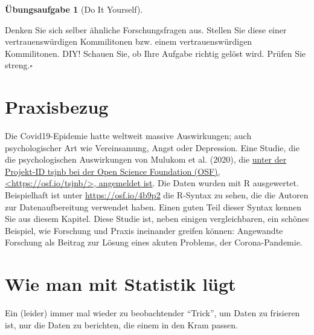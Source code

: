\documentclass[
  a4paper,
]{scrbook}
\theoremstyle{definition}
\theoremstyle{definition}
\theoremstyle{definition}
\newtheorem{exercise}{Übungsaufgabe}[chapter]
\theoremstyle{remark}
\begin{document}
\begin{exercise}[Do It
Yourself]\protect\hypertarget{exr-diy}{}\label{exr-diy}

Denken Sie sich selber ähnliche Forschungsfragen aus. Stellen Sie diese
einer vertrauenswürdigen Kommilitonen bzw. einem vertrauenswürdigen
Kommilitonen. DIY! Schauen Sie, ob Ihre Aufgabe richtig gelöst wird.
Prüfen Sie streng.\(\square\)

\end{exercise}

\section{Praxisbezug}\label{praxisbezug-2}

Die Covid19-Epidemie hatte weltweit massive Auswirkungen; auch
psychologischer Art wie Vereinsamung, Angst oder Depression. Eine
Studie, die die psychologischen Auswirkungen von Mulukom et al. (2020),
die \href{https://osf.io/tsjnb/}{unter der Projekt-ID tsjnb bei der Open
Science Foundation (OSF), \textless https://osf.io/tsjnb/\textgreater,
angemeldet ist}. Die Daten wurden mit R ausgewertet. Beispielhaft ist
unter \url{https://osf.io/4b9p2} die R-Syntax zu sehen, die die Autoren
zur Datenaufbereitung verwendet haben. Einen guten Teil dieser Syntax
kennen Sie aus diesem Kapitel. Diese Studie ist, neben einigen
vergleichbaren, ein schönes Beispiel, wie Forschung und Praxis
ineinander greifen können: Angewandte Forschung als Beitrag zur Lösung
eines akuten Problems, der Corona-Pandemie.

\section{Wie man mit Statistik
lügt}\label{wie-man-mit-statistik-luxfcgt-1}

Ein (leider) immer mal wieder zu beobachtender ``Trick'', um Daten zu
frisieren ist, nur die Daten zu berichten, die einem in den Kram passen.
\end{document}
